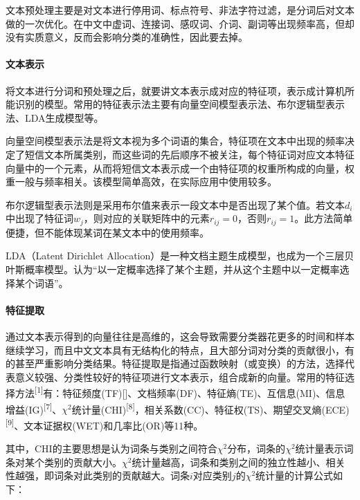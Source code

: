 \documentclass{article}
\begin{document}
文本预处理主要是对文本进行停用词、标点符号、非法字符过滤，是分词后对文本做的一次优化。在中文中虚词、连接词、感叹词、介词、副词等出现频率高，但却没有实质意义，反而会影响分类的准确性，因此要去掉。

\paragraph{文本表示}\label{ux6587ux672cux8868ux793a}

将文本进行分词和预处理之后，就要讲文本表示成对应的特征项，表示成计算机所能识别的模型。常用的特征表示法主要有向量空间模型表示法、布尔逻辑型表示法、LDA生成模型等。

向量空间模型表示法是将文本视为多个词语的集合，特征项在文本中出现的频率决定了短信文本所属类别，而这些词的先后顺序不被关注，每个特征词对应文本特征向量中的一个元素，从而将短信文本表示成一个由特征项的权重所构成的向量，权重一般与频率相关。该模型简单高效，在实际应用中使用较多。

布尔逻辑型表示法则是采用布尔值来表示一段文本中是否出现了某个值。若文本\(d_i\)中出现了特征词\(w_j\)，则对应的关联矩阵中的元素\(r_{ij}=0\)，否则\(r_{ij}=1\)。此方法简单便捷，但不能体现某词在某文本中的使用频率。

LDA（Latent Dirichlet
Allocation）是一种文档主题生成模型，也成为一个三层贝叶斯概率模型。认为``以一定概率选择了某个主题，并从这个主题中以一定概率选择某个词语''。

\paragraph{特征提取}\label{ux7279ux5f81ux63d0ux53d6}

通过文本表示得到的向量往往是高维的，这会导致需要分类器花更多的时间和样本继续学习，而且中文文本具有无结构化的特点，且大部分词对分类的贡献很小，有的甚至严重影响分类结果。特征提取是指通过函数映射（或变换）的方法，选择代表意义较强、分类性较好的特征项进行文本表示，组合成新的向量。常用的特征选择方法\textsuperscript{{[}1{]}}有：特征频度(TF){[}{]}、文档频率(DF)、特征熵(TE)、互信息(MI)、信息增益(IG)\textsuperscript{{[}7{]}}、\(\chi^2\)统计量(CHI)\textsuperscript{{[}8{]}}，相关系数(CC)、特征权(TS)、期望交叉熵(ECE)\textsuperscript{{[}9{]}}、文本证据权(WET)和几率比(OR)等11种。

其中，CHI的主要思想是认为词条与类别之间符合\(\chi^2\)分布，词条的\(\chi^2\)统计量表示词条对某个类别的贡献大小。\(\chi^2\)统计量越高，词条和类别之间的独立性越小、相关性越强，即词条对此类别的贡献越大。词条\(i\)对应类别\(j\)的\(\chi^2\)统计量的计算公式如下：
\end{document}
